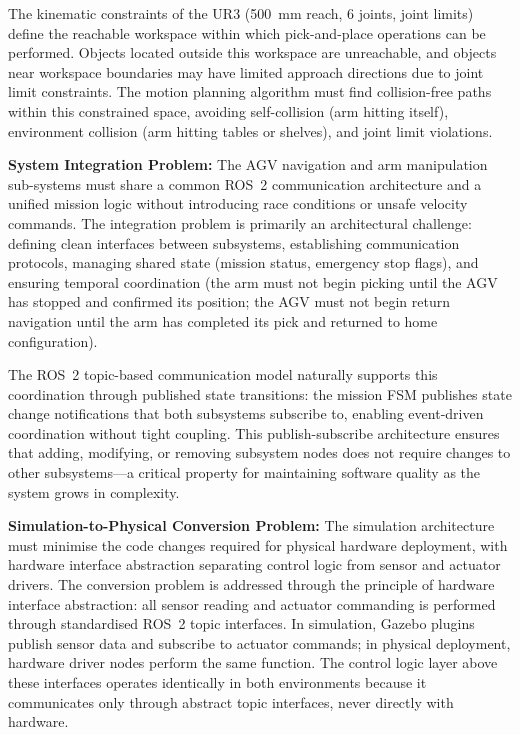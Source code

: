 \documentclass[12pt,a4paper,oneside]{report}
\begin{document}
The kinematic constraints of the UR3 (500~mm reach, 6 joints, joint limits) define the reachable workspace within which pick-and-place operations can be performed. Objects located outside this workspace are unreachable, and objects near workspace boundaries may have limited approach directions due to joint limit constraints. The motion planning algorithm must find collision-free paths within this constrained space, avoiding self-collision (arm hitting itself), environment collision (arm hitting tables or shelves), and joint limit violations.

\textbf{System Integration Problem:} The AGV navigation and arm manipulation sub-systems must share a common ROS~2 communication architecture and a unified mission logic without introducing race conditions or unsafe velocity commands. The integration problem is primarily an architectural challenge: defining clean interfaces between subsystems, establishing communication protocols, managing shared state (mission status, emergency stop flags), and ensuring temporal coordination (the arm must not begin picking until the AGV has stopped and confirmed its position; the AGV must not begin return navigation until the arm has completed its pick and returned to home configuration).

The ROS~2 topic-based communication model naturally supports this coordination through published state transitions: the mission FSM publishes state change notifications that both subsystems subscribe to, enabling event-driven coordination without tight coupling. This publish-subscribe architecture ensures that adding, modifying, or removing subsystem nodes does not require changes to other subsystems---a critical property for maintaining software quality as the system grows in complexity.

\textbf{Simulation-to-Physical Conversion Problem:} The simulation architecture must minimise the code changes required for physical hardware deployment, with hardware interface abstraction separating control logic from sensor and actuator drivers. The conversion problem is addressed through the principle of hardware interface abstraction: all sensor reading and actuator commanding is performed through standardised ROS~2 topic interfaces. In simulation, Gazebo plugins publish sensor data and subscribe to actuator commands; in physical deployment, hardware driver nodes perform the same function. The control logic layer above these interfaces operates identically in both environments because it communicates only through abstract topic interfaces, never directly with hardware.
\end{document}
